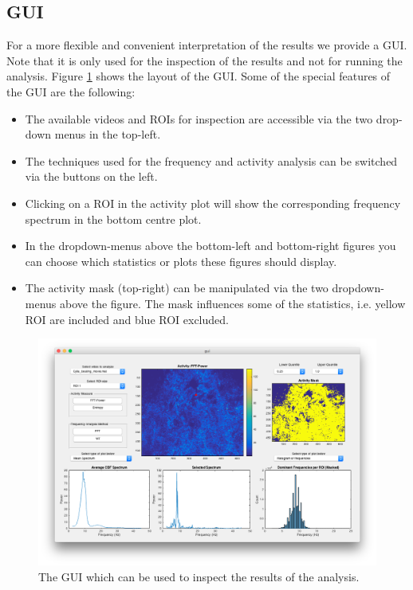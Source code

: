 \documentclass[11pt]{scrartcl}
\begin{document}
\subsection{GUI}

For a more flexible and convenient interpretation of the results we provide a GUI. Note that it is only used for the inspection of the results and not for running the analysis. Figure \ref{fig:gui} shows the layout of the GUI. Some of the special features of the GUI are the following:
\begin{itemize}
\item The available videos and ROIs for inspection are accessible via the two drop-down menus in the top-left.
\item The techniques used for the frequency and activity analysis can be switched via the buttons on the left.
\item Clicking on a ROI in the activity plot will show the corresponding frequency spectrum in the bottom centre plot.
\item In the dropdown-menus above the bottom-left and bottom-right figures you can choose which statistics or plots these figures should display.
\item The activity mask (top-right) can be manipulated via the two dropdown-menus above the figure. The mask influences some of the statistics, i.e. yellow ROI are included and blue ROI excluded.
\end{itemize}
 

\begin{figure}[h]
  \centering
  \includegraphics[width=0.9\linewidth]{GUI}
  \caption{The GUI which can be used to inspect the results of the analysis.}
  \label{fig:gui}
\end{figure}
\end{document}
